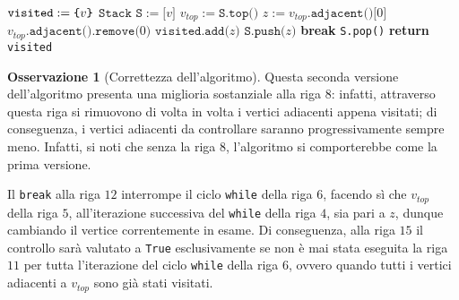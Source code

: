 \documentclass[14pt]{extreport}
\theoremstyle{definition}
\theoremstyle{definition}
\newtheorem{remark}{Osservazione}[subsection]
\begin{document}
\begin{algorithm}[H]
    \caption{
        Seconda versione dell'algoritmo; dato un grafo $G$, diretto o indiretto, rappresentato attraverso liste di adiacenza, e un suo vertice $v$, l'algoritmo restituisce tutti i vertici, raggiungibili attraverso cammini, partendo da $v$.\\
        \textbf{Input}: $G$ un grafo, rappresentato attraverso liste di adiacenza; $v$ un vertice di $G$.\\
        \textbf{Output}: i vertici raggiungibili da $v$.
    }

    \begin{algorithmic}[1]
        \label{findReachableNodes2}
            \State $\texttt{visited} := \verb|{|v\verb|}|$
            \State $\texttt{Stack S} := \texttt{[}v\texttt{]}$
                \State $v_{top}:=\texttt{S.top()}$
                    \State $z := v_{top}\texttt{.adjacent()[}0\texttt{]}$
                    \State $v_{top}\texttt{.adjacent().remove(}0\texttt{)}$ 
                        \State $\texttt{visited.add(}z\texttt{)}$
                        \State $\texttt{S.push(}z\texttt{)}$
                        \State \textbf{break}
                    \EndIf
                \EndWhile
                    \State \texttt{S.pop()}
                \EndIf
            \EndWhile
            \State \textbf{return} \texttt{visited}
        \EndFunction
    \end{algorithmic}
\end{algorithm}

\begin{remark}[Correttezza dell'algoritmo]
    Questa seconda versione dell'algoritmo presenta una miglioria sostanziale alla riga $8$: infatti, attraverso questa riga si rimuovono di volta in volta i vertici adiacenti appena visitati; di conseguenza, i vertici adiacenti da controllare saranno progressivamente sempre meno. Infatti, si noti che senza la riga $8$, l'algoritmo si comporterebbe come la prima versione.

    Il \texttt{break} alla riga $12$ interrompe il ciclo \texttt{while} della riga $6$, facendo sì che $v_{top}$ della riga $5$, all'iterazione successiva del \texttt{while} della riga $4$, sia pari a $z$, dunque cambiando il vertice correntemente in esame. Di conseguenza, alla riga $15$ il controllo sarà valutato a \texttt{True} esclusivamente se non è mai stata eseguita la riga $11$ per tutta l'iterazione del ciclo \texttt{while} della riga $6$, ovvero quando tutti i vertici adiacenti a $v_{top}$ sono già stati visitati.
\end{remark}
\end{document}
